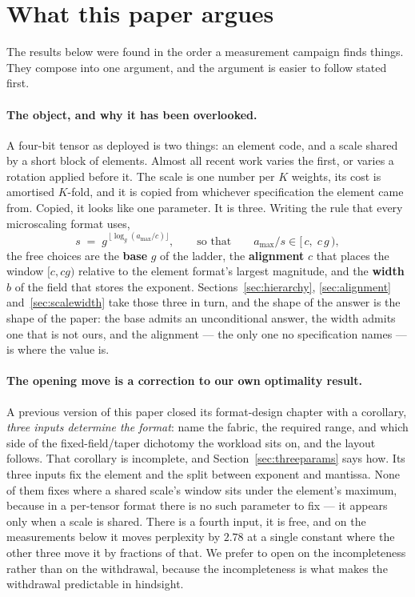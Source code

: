 \documentclass[11pt]{article}
\theoremstyle{definition}
\begin{document}
\section{What this paper argues}
\label{sec:roadmap}

The results below were found in the order a measurement campaign finds things.
They compose into one argument, and the argument is easier to follow stated
first.

\paragraph{The object, and why it has been overlooked.} A four-bit tensor as
deployed is two things: an element code, and a scale shared by a short block of
elements. Almost all recent work varies the first, or varies a rotation applied
before it. The scale is one number per $K$ weights, its cost is amortised
$K$-fold, and it is copied from whichever specification the element came from.
Copied, it looks like one parameter. It is three. Writing the rule that every
microscaling format uses,
\begin{equation}
\label{eq:scalerule}
  s \;=\; g^{\,\lfloor \log_{g}(a_{\max}/c) \rfloor},
  \qquad\text{so that}\qquad a_{\max}/s \in [\,c,\; c\,g\,),
\end{equation}
the free choices are the \textbf{base} $g$ of the ladder, the
\textbf{alignment} $c$ that places the window $[c, cg)$ relative to the element
format's largest magnitude, and the \textbf{width} $b$ of the field that stores
the exponent. Sections~\ref{sec:hierarchy}, \ref{sec:alignment}
and~\ref{sec:scalewidth} take those three in turn, and the shape of the answer
is the shape of the paper: the base admits an unconditional answer, the width
admits one that is not ours, and the alignment --- the only one no
specification names --- is where the value is.

\paragraph{The opening move is a correction to our own optimality result.}
A previous version of this paper closed its format-design chapter with a
corollary, \emph{three inputs determine the format}: name the fabric, the
required range, and which side of the fixed-field/taper dichotomy the workload
sits on, and the layout follows. That corollary is incomplete, and
Section~\ref{sec:threeparams} says how. Its three inputs fix the element and
the split between exponent and mantissa. None of them fixes where a shared
scale's window sits under the element's maximum, because in a per-tensor format
there is no such parameter to fix --- it appears only when a scale is shared.
There is a fourth input, it is free, and on the measurements below it moves
perplexity by $2.78$ at a single constant where the other three move it by
fractions of that. We
prefer to open on the incompleteness rather than on the withdrawal, because the
incompleteness is what makes the withdrawal predictable in hindsight.
\end{document}
